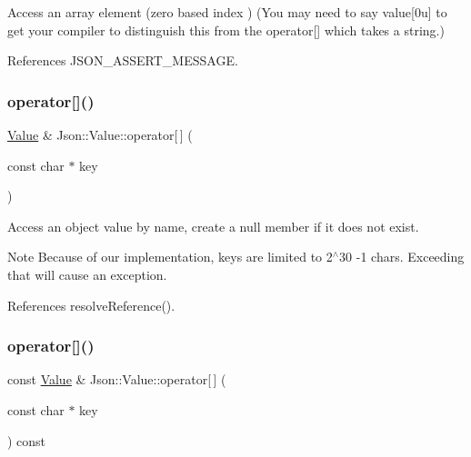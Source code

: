 Access an array element (zero based index ) (You may need to say \textquotesingle{}value\mbox{[}0u\mbox{]}\textquotesingle{} to get your compiler to distinguish this from the operator\mbox{[}\mbox{]} which takes a string.) 

References J\+S\+O\+N\+\_\+\+A\+S\+S\+E\+R\+T\+\_\+\+M\+E\+S\+S\+A\+GE.

\mbox{\label{classJson_1_1Value_acb912f4ec40a25ea6eb387730885f3d9_acb912f4ec40a25ea6eb387730885f3d9}} 
\subsubsection{\texorpdfstring{operator[]()}{operator[]()}\hspace{0.1cm}{\footnotesize\ttfamily [5/9]}}
{\footnotesize\ttfamily \hyperlink{classJson_1_1Value}{Value} \& Json\+::\+Value\+::operator\mbox{[}$\,$\mbox{]} (\begin{DoxyParamCaption}\item[{const char $\ast$}]{key }\end{DoxyParamCaption})}

Access an object value by name, create a null member if it does not exist. \begin{DoxyNote}{Note}
Because of our implementation, keys are limited to 2$^\wedge$30 -\/1 chars. Exceeding that will cause an exception. 
\end{DoxyNote}


References resolve\+Reference().

\mbox{\label{classJson_1_1Value_a1b0498b7b2a520a68137f682d91abdd5_a1b0498b7b2a520a68137f682d91abdd5}} 
\subsubsection{\texorpdfstring{operator[]()}{operator[]()}\hspace{0.1cm}{\footnotesize\ttfamily [6/9]}}
{\footnotesize\ttfamily const \hyperlink{classJson_1_1Value}{Value} \& Json\+::\+Value\+::operator\mbox{[}$\,$\mbox{]} (\begin{DoxyParamCaption}\item[{const char $\ast$}]{key }\end{DoxyParamCaption}) const}

